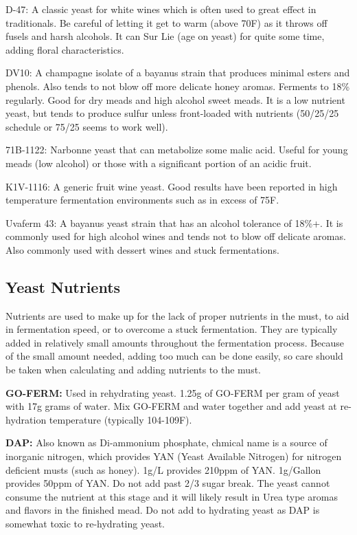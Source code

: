 \documentclass{article}
\begin{document}
  D-47: A classic yeast for white wines which is often used to great effect in traditionals. Be careful of letting it get to warm (above 70\textdegree F) as it throws off fusels and harsh alcohols. It can Sur Lie (age on yeast) for quite some time, adding floral characteristics.

  DV10: A champagne isolate of a bayanus strain that produces minimal esters and phenols. Also tends to not blow off more delicate honey aromas. 
  Ferments to 18\% regularly. Good for dry meads and high alcohol sweet meads. It is a low nutrient yeast, but tends to produce sulfur unless 
  front-loaded with nutrients (50/25/25 schedule or 75/25 seems to work well).

  71B-1122: Narbonne yeast that can metabolize some malic acid. Useful for young meads (low alcohol) or those with a 
  significant portion of an acidic fruit.

  K1V-1116: A generic fruit wine yeast. Good results have been reported in high temperature fermentation environments such as in excess of 75\textdegree F.

  Uvaferm 43: A bayanus yeast strain that has an alcohol tolerance of 18\%+. It is commonly used for high alcohol wines and tends not to blow off 
  delicate aromas. Also commonly used with dessert wines and stuck fermentations. 

 \subsection{Yeast Nutrients}
  Nutrients are used to make up for the lack of proper nutrients in the must, to aid in fermentation speed, or to overcome a stuck fermentation. 
  They are typically added in relatively small amounts throughout the fermentation process. Because of the small amount needed, adding too 
  much can be done easily, so care should be taken when calculating and adding nutrients to the must.

  \textbf{GO-FERM:} Used in rehydrating yeast. 1.25g of GO-FERM per gram of yeast with 17g grams of water. Mix GO-FERM and water together  
  and add yeast at re-hydration temperature (typically 104-109F). 

  \textbf{DAP:} Also known as Di-ammonium phosphate, chmical name  is a source of inorganic nitrogen, which provides YAN 
  (Yeast Available Nitrogen) for nitrogen deficient musts (such as honey). 1g/L provides 210ppm of YAN. 1g/Gallon provides 50ppm of YAN. 
  Do not add past 2/3 sugar break. The yeast cannot consume the nutrient at this stage and it will likely result in Urea type aromas and 
  flavors in the finished mead. Do not add to hydrating yeast as DAP is somewhat toxic to re-hydrating yeast.
\end{document}
